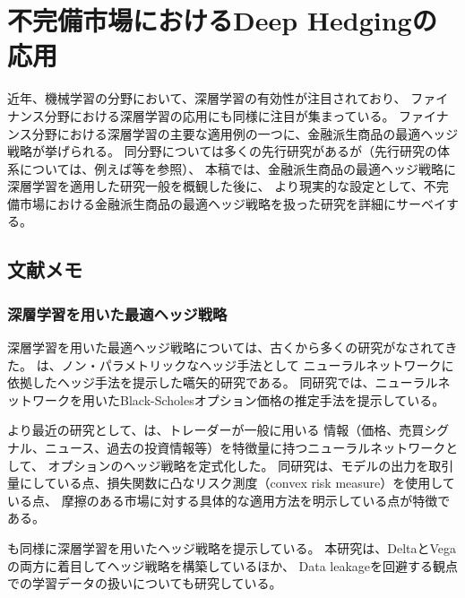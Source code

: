 \documentclass[autodetect-engine, dvipdfmx-if-dvi, ja=standard]{ltjsarticle}
\begin{document}
\section{不完備市場におけるDeep Hedgingの応用}
近年、機械学習の分野において、深層学習の有効性が注目されており、
ファイナンス分野における深層学習の応用にも同様に注目が集まっている。
ファイナンス分野における深層学習の主要な適用例の一つに、金融派生商品の最適ヘッジ戦略が挙げられる。
同分野については多くの先行研究があるが（先行研究の体系については、例えば\cite{ruf2020neural}等を参照）、
本稿では、金融派生商品の最適ヘッジ戦略に深層学習を適用した研究一般を概観した後に、
より現実的な設定として、不完備市場における金融派生商品の最適ヘッジ戦略を扱った研究を詳細にサーベイする。

\subsection{文献メモ}
\subsubsection{深層学習を用いた最適ヘッジ戦略}

深層学習を用いた最適ヘッジ戦略については、古くから多くの研究がなされてきた。
\cite{hutchinson1994nonparametric}は、ノン・パラメトリックなヘッジ手法として
ニューラルネットワークに依拠したヘッジ手法を提示した嚆矢的研究である。
同研究では、ニューラルネットワークを用いたBlack-Scholesオプション価格の推定手法を提示している。

より最近の研究として、\cite{buehler2019deepA,buehler2019deepB}は、トレーダーが一般に用いる
情報（価格、売買シグナル、ニュース、過去の投資情報等）を特徴量に持つニューラルネットワークとして、
オプションのヘッジ戦略を定式化した。
同研究は、モデルの出力を取引量にしている点、損失関数に凸なリスク測度（convex risk measure）を使用している点、
摩擦のある市場に対する具体的な適用方法を明示している点が特徴である。

\cite{ruf2020hedging}も同様に深層学習を用いたヘッジ戦略を提示している。
本研究は、DeltaとVegaの両方に着目してヘッジ戦略を構築しているほか、
Data leakageを回避する観点での学習データの扱いについても研究している。


 

\end{document}
